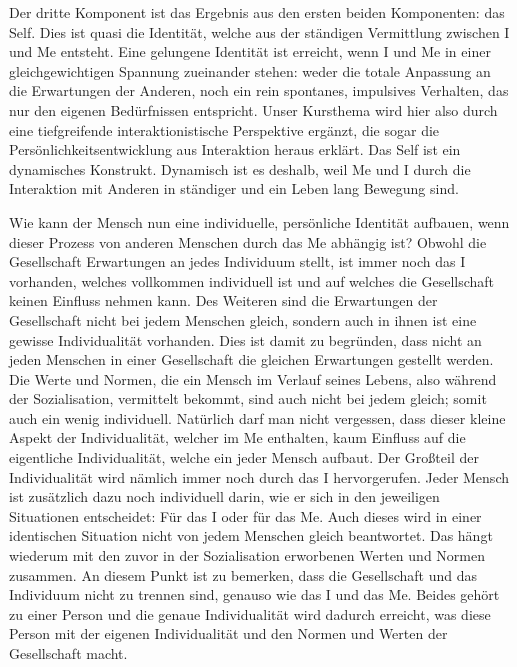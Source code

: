 Der dritte Komponent ist das Ergebnis aus den ersten beiden Komponenten: das Self.
Dies ist quasi die Identität, welche aus der ständigen Vermittlung zwischen I und Me entsteht.
Eine gelungene Identität ist erreicht, wenn I und Me in einer gleichgewichtigen Spannung zueinander stehen: weder die totale Anpassung an die Erwartungen der Anderen, noch ein rein spontanes, impulsives Verhalten, das nur den eigenen Bedürfnissen entspricht.
Unser Kursthema wird hier also durch eine tiefgreifende interaktionistische Perspektive ergänzt, die sogar die Persönlichkeitsentwicklung aus Interaktion heraus erklärt.
Das Self ist ein dynamisches Konstrukt.
Dynamisch ist es deshalb, weil Me und I durch die Interaktion mit Anderen in ständiger und ein Leben lang Bewegung sind.

Wie kann der Mensch nun eine individuelle, persönliche Identität aufbauen, wenn dieser Prozess von anderen Menschen durch das Me abhängig ist?
Obwohl die Gesellschaft Erwartungen an jedes Individuum stellt, ist immer noch das I vorhanden, welches vollkommen individuell ist und auf welches die Gesellschaft keinen Einfluss nehmen kann.
Des Weiteren sind die Erwartungen der Gesellschaft nicht bei jedem Menschen gleich, sondern auch in ihnen ist eine gewisse Individualität vorhanden.
Dies ist damit zu begründen, dass nicht an jeden Menschen in einer Gesellschaft die gleichen Erwartungen gestellt werden.
Die Werte und Normen, die ein Mensch im Verlauf seines Lebens, also während der Sozialisation, vermittelt bekommt, sind auch nicht bei jedem gleich; somit auch ein wenig individuell.
Natürlich darf man nicht vergessen, dass dieser kleine Aspekt der Individualität, welcher im Me enthalten, kaum Einfluss auf die eigentliche Individualität, welche ein jeder Mensch aufbaut.
Der Großteil der Individualität wird nämlich immer noch durch das I hervorgerufen.
Jeder Mensch ist zusätzlich dazu noch individuell darin, wie er sich in den jeweiligen Situationen entscheidet: Für das I oder für das Me. Auch dieses wird in einer identischen Situation nicht von jedem Menschen gleich beantwortet. Das hängt wiederum mit den zuvor in der Sozialisation erworbenen Werten und Normen zusammen.
An diesem Punkt ist zu bemerken, dass die Gesellschaft und das Individuum nicht zu trennen sind, genauso wie das I und das Me.
Beides gehört zu einer Person und die genaue Individualität wird dadurch erreicht, was diese Person mit der eigenen Individualität und den Normen und Werten der Gesellschaft macht.
